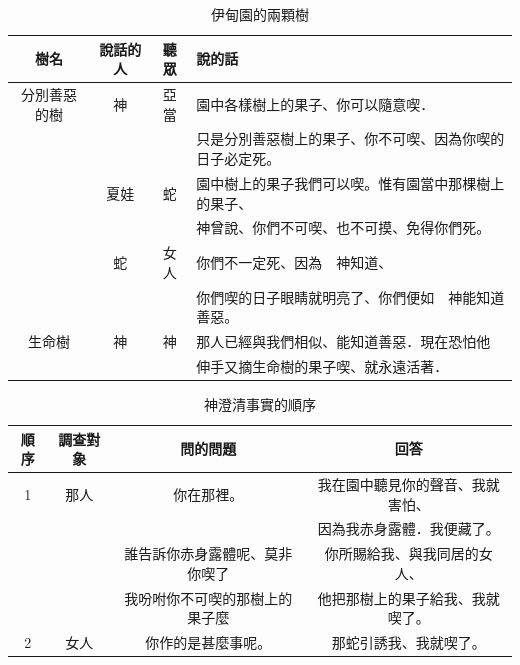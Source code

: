 \begin{table}[H]
\centering
\begin{tabular}{|c|c|c|l|   }
\hline
\hline
樹名   & 說話的人 & 聽眾 &說的話                  \\\hline
分別善惡的樹&神& 亞當&園中各樣樹上的果子、你可以隨意喫．\\
            &  &   &只是分別善惡樹上的果子、你不可喫、因為你喫的日子必定死。\\
            &夏娃&蛇&園中樹上的果子我們可以喫。惟有園當中那棵樹上的果子、\\
            &    &&神曾說、你們不可喫、也不可摸、免得你們死。\\           
            &蛇  &女人&你們不一定死、因為　神知道、\\
            &    &&你們喫的日子眼睛就明亮了、你們便如　神能知道善惡。\\ \hline             
生命樹&神&神&那人已經與我們相似、能知道善惡．現在恐怕他\\
&&&伸手又摘生命樹的果子喫、就永遠活著．                  \\\hline
\end{tabular}
\caption{伊甸園的兩顆樹}
\end{table}

\iffalse
\begin{table}[!hbp]
\centering
\begin{tabular}{|c|c|c|c|    }
\hline
\hline
順序&調查對象   & 問的問題 & 回答                    \\\hline
1&那人       & 你在那裡。 & 我在園中聽見你的聲音、我就害怕、 \\
 &          &           &因為我赤身露體．我便藏了。\\\hline
 &          & 誰告訴你赤身露體呢、莫非你喫了 & 你所賜給我、與我同居的女人、\\
 &          & 我吩咐你不可喫的那樹上的果子麼& 他把那樹上的果子給我、我就喫了。\\\hline
2& 女人       &你作的是甚麼事呢。 &那蛇引誘我、我就喫了。\\\hline
\end{tabular}
\caption{神澄清事實的順序}
\end{table}



